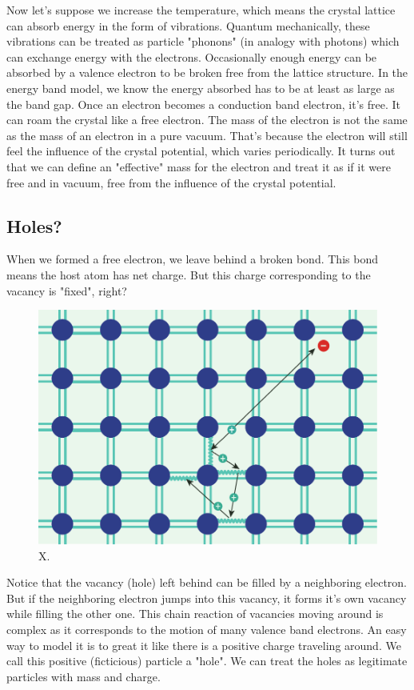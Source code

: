 Now let's suppose we increase the temperature, which means the crystal lattice can absorb energy in the form of vibrations.  Quantum mechanically, these vibrations can be treated as particle "phonons" (in analogy with photons) which can exchange energy with the electrons.  Occasionally enough energy can be absorbed by a valence electron to be broken free from the lattice structure.  In the energy band model, we know the energy absorbed has to be at least as large as the band gap.  Once an electron becomes a conduction band electron, it's free.  It can roam the crystal like a free electron.  The mass of the electron is not the same as the mass of an electron in a pure vacuum.  That's because the electron will still feel the influence of the crystal potential, which varies periodically.  It turns out that we can define an "effective" mass for the electron and treat it as if it were free and in vacuum, free from the influence of the crystal potential.  


\subsection{Holes?}

When we formed a free electron, we leave behind a broken bond.  This bond means the host atom has net charge.  But this charge corresponding to the vacancy is "fixed", right?

\begin{figure}
\begin{center}
\includegraphics[width=.5\columnwidth]{silicon_hole}
\end{center}
\caption{X. } \label{fig:silicon_hole}
\end{figure}
  
Notice that the vacancy (hole) left behind can be filled by a neighboring electron.   But if the neighboring electron jumps into this vacancy, it forms it's own vacancy while filling the other one.  This chain reaction of vacancies moving around is complex as it corresponds to the motion of many valence band electrons.  An easy way to model it is to great it like there is a positive charge traveling around.  We call this positive (ficticious) particle a "hole".  We can treat the holes as legitimate particles with mass and charge.
 


